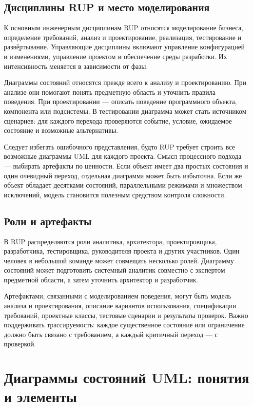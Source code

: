 \documentclass[essay,paper]{pmk-graduate}
\begin{document}
\subsection{Дисциплины RUP и место моделирования}

К основным инженерным дисциплинам RUP относятся моделирование бизнеса, определение требований, анализ и проектирование, реализация, тестирование и развёртывание. Управляющие дисциплины включают управление конфигурацией и изменениями, управление проектом и обеспечение среды разработки. Их интенсивность меняется в зависимости от фазы.

Диаграммы состояний относятся прежде всего к анализу и проектированию. При анализе они помогают понять предметную область и уточнить правила поведения. При проектировании — описать поведение программного объекта, компонента или подсистемы. В тестировании диаграмма может стать источником сценариев: для каждого перехода проверяются событие, условие, ожидаемое состояние и возможные альтернативы.

Следует избегать ошибочного представления, будто RUP требует строить все возможные диаграммы UML для каждого проекта. Смысл процессного подхода — выбирать артефакты по ценности. Если объект имеет два простых состояния и один очевидный переход, отдельная диаграмма может быть избыточна. Если же объект обладает десятками состояний, параллельными режимами и множеством исключений, модель становится полезным средством контроля сложности.

\subsection{Роли и артефакты}

В RUP распределяются роли аналитика, архитектора, проектировщика, разработчика, тестировщика, руководителя проекта и других участников. Один человек в небольшой команде может совмещать несколько ролей. Диаграмму состояний может подготовить системный аналитик совместно с экспертом предметной области, а затем уточнить архитектор и разработчик.

Артефактами, связанными с моделированием поведения, могут быть модель анализа и проектирования, описание вариантов использования, спецификации требований, проектные классы, тестовые сценарии и результаты проверок. Важно поддерживать трассируемость: каждое существенное состояние или ограничение должно быть связано с требованием, а каждый критичный переход — с проверкой.

\section{Диаграммы состояний UML: понятия и элементы}
\end{document}

